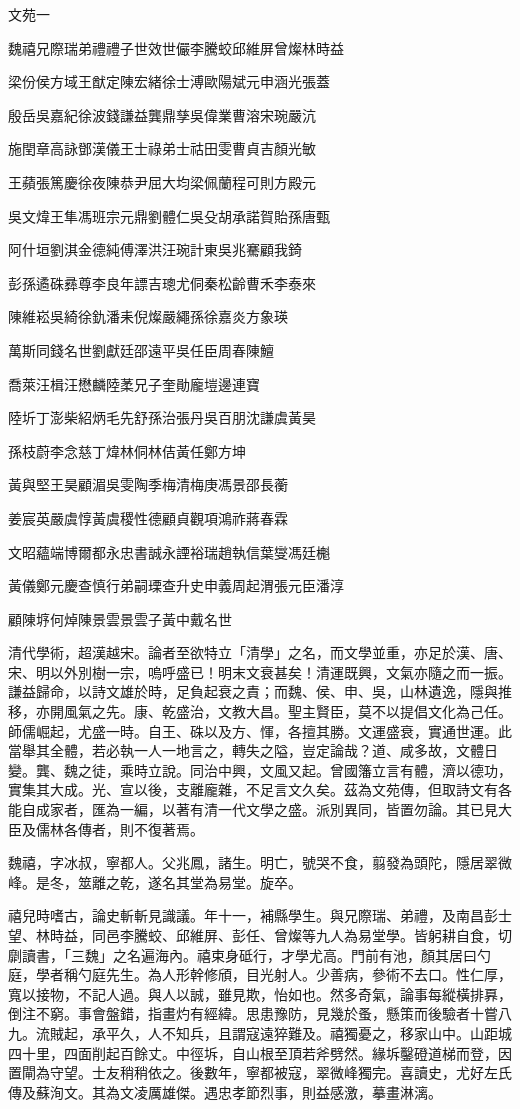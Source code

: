 
\begin{pinyinscope}
文苑一

魏禧兄際瑞弟禮禮子世效世儼李騰蛟邱維屏曾燦林時益

梁份侯方域王猷定陳宏緒徐士溥歐陽斌元申涵光張蓋

殷岳吳嘉紀徐波錢謙益龔鼎孳吳偉業曹溶宋琬嚴沆

施閏章高詠鄧漢儀王士祿弟士祜田雯曹貞吉顏光敏

王蘋張篤慶徐夜陳恭尹屈大均梁佩蘭程可則方殿元

吳文煒王隼馮班宗元鼎劉體仁吳殳胡承諾賀貽孫唐甄

阿什垣劉淇金德純傅澤洪汪琬計東吳兆騫顧我錡

彭孫遹硃彞尊李良年謤吉璁尤侗秦松齡曹禾李泰來

陳維崧吳綺徐釚潘耒倪燦嚴繩孫徐嘉炎方象瑛

萬斯同錢名世劉獻廷邵遠平吳任臣周春陳鱣

喬萊汪楫汪懋麟陸葇兄子奎勛龐塏邊連寶

陸圻丁澎柴紹炳毛先舒孫治張丹吳百朋沈謙虞黃昊

孫枝蔚李念慈丁煒林侗林佶黃任鄭方坤

黃與堅王昊顧湄吳雯陶季梅清梅庚馮景邵長蘅

姜宸英嚴虞惇黃虞稷性德顧貞觀項鴻祚蔣春霖

文昭蘊端博爾都永忠書誠永諲裕瑞趙執信葉燮馮廷櫆

黃儀鄭元慶查慎行弟嗣瑮查升史申義周起渭張元臣潘淳

顧陳垿何焯陳景雲景雲子黃中戴名世

清代學術，超漢越宋。論者至欲特立「清學」之名，而文學並重，亦足於漢、唐、宋、明以外別樹一宗，嗚呼盛已！明末文衰甚矣！清運既興，文氣亦隨之而一振。謙益歸命，以詩文雄於時，足負起衰之責；而魏、侯、申、吳，山林遺逸，隱與推移，亦開風氣之先。康、乾盛治，文教大昌。聖主賢臣，莫不以提倡文化為己任。師儒崛起，尤盛一時。自王、硃以及方、惲，各擅其勝。文運盛衰，實通世運。此當舉其全體，若必執一人一地言之，轉失之隘，豈定論哉？道、咸多故，文體日變。龔、魏之徒，乘時立說。同治中興，文風又起。曾國籓立言有體，濟以德功，實集其大成。光、宣以後，支離龐雜，不足言文久矣。茲為文苑傳，但取詩文有各能自成家者，匯為一編，以著有清一代文學之盛。派別異同，皆置勿論。其已見大臣及儒林各傳者，則不復著焉。

魏禧，字冰叔，寧都人。父兆鳳，諸生。明亡，號哭不食，翦發為頭陀，隱居翠微峰。是冬，筮離之乾，遂名其堂為易堂。旋卒。

禧兒時嗜古，論史斬斬見識議。年十一，補縣學生。與兄際瑞、弟禮，及南昌彭士望、林時益，同邑李騰蛟、邱維屏、彭任、曾燦等九人為易堂學。皆躬耕自食，切劘讀書，「三魏」之名遍海內。禧束身砥行，才學尤高。門前有池，顏其居曰勺庭，學者稱勺庭先生。為人形幹修頎，目光射人。少善病，參術不去口。性仁厚，寬以接物，不記人過。與人以誠，雖見欺，怡如也。然多奇氣，論事每縱橫排奡，倒注不窮。事會盤錯，指畫灼有經緯。思患豫防，見幾於蚤，懸策而後驗者十嘗八九。流賊起，承平久，人不知兵，且謂寇遠猝難及。禧獨憂之，移家山中。山距城四十里，四面削起百餘丈。中徑坼，自山根至頂若斧劈然。緣坼鑿磴道梯而登，因置閘為守望。士友稍稍依之。後數年，寧都被寇，翠微峰獨完。喜讀史，尤好左氏傳及蘇洵文。其為文凌厲雄傑。遇忠孝節烈事，則益感激，摹畫淋漓。


\end{pinyinscope}
